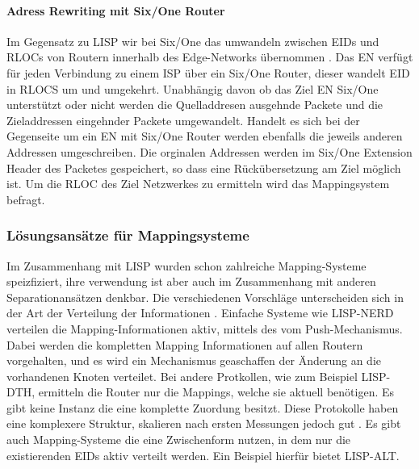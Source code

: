 \paragraph{Adress Rewriting mit Six/One Router}
Im Gegensatz zu LISP wir bei Six/One das umwandeln zwischen EIDs und RLOCs von Routern innerhalb des Edge-Networks übernommen \cite{vogt:2008:six}. Das EN verfügt für jeden Verbindung zu einem ISP über ein Six/One Router, dieser wandelt EID in RLOCS um und umgekehrt. Unabhängig davon ob das Ziel EN Six/One unterstützt oder nicht werden die Quelladdresen ausgehnde Packete und die Zieladdressen eingehnder Packete umgewandelt. Handelt es sich bei der Gegenseite um ein EN mit Six/One Router werden ebenfalls die jeweils anderen Addressen umgeschreiben. Die orginalen Addressen werden im Six/One Extension Header des Packetes gespeichert, so dass eine Rückübersetzung am Ziel möglich ist. Um die RLOC des Ziel Netzwerkes zu ermitteln wird das Mappingsystem befragt.

\subsubsection{Lösungsansätze für Mappingsysteme}
Im Zusammenhang mit LISP wurden schon zahlreiche Mapping-Systeme speizfiziert, ihre verwendung ist aber auch im Zusammenhang mit anderen Separationansätzen denkbar. Die verschiedenen Vorschläge unterscheiden sich in der Art der Verteilung der Informationen \cite{mathy:2008:dht}. Einfache Systeme wie LISP-NERD verteilen die Mapping-Informationen aktiv, mittels des vom Push-Mechanismus. Dabei werden die kompletten Mapping Informationen auf allen Routern vorgehalten, und es wird ein Mechanismus geaschaffen der Änderung an die vorhandenen Knoten verteilet. Bei andere Protkollen, wie zum Beispiel LISP-DTH, ermitteln die Router nur die Mappings, welche sie aktuell benötigen. Es gibt keine Instanz die eine komplette Zuordung besitzt. Diese Protokolle haben eine komplexere Struktur, skalieren nach ersten Messungen jedoch gut \cite{iannone:2007:cost}. Es gibt auch Mapping-Systeme die eine Zwischenform nutzen, in dem nur die existierenden EIDs aktiv verteilt werden. Ein Beispiel hierfür bietet LISP-ALT.

